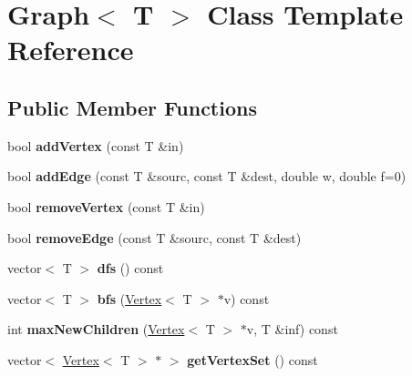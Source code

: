 \hypertarget{classGraph}{\section{Graph$<$ T $>$ Class Template Reference}
\label{classGraph}
}
\subsection*{Public Member Functions}
\begin{DoxyCompactItemize}
\item 
\hypertarget{classGraph_a00be284ea2be3b3d0f0d2e493b70245b}{bool {\bfseries add\-Vertex} (const T \&in)}\label{classGraph_a00be284ea2be3b3d0f0d2e493b70245b}

\item 
\hypertarget{classGraph_a78d952c4aa7ca2b828c1042b12995069}{bool {\bfseries add\-Edge} (const T \&sourc, const T \&dest, double w, double f=0)}\label{classGraph_a78d952c4aa7ca2b828c1042b12995069}

\item 
\hypertarget{classGraph_af9c903104ad69a7782979fa9caedf163}{bool {\bfseries remove\-Vertex} (const T \&in)}\label{classGraph_af9c903104ad69a7782979fa9caedf163}

\item 
\hypertarget{classGraph_a1106092a37366486cf55576f9ec01692}{bool {\bfseries remove\-Edge} (const T \&sourc, const T \&dest)}\label{classGraph_a1106092a37366486cf55576f9ec01692}

\item 
\hypertarget{classGraph_a6f66082eeeaef42d51cb7f2e2c3cb6e2}{vector$<$ T $>$ {\bfseries dfs} () const }\label{classGraph_a6f66082eeeaef42d51cb7f2e2c3cb6e2}

\item 
\hypertarget{classGraph_acd33e9b4f345aa28cf73f537ba176e6c}{vector$<$ T $>$ {\bfseries bfs} (\hyperlink{classVertex}{Vertex}$<$ T $>$ $\ast$v) const }\label{classGraph_acd33e9b4f345aa28cf73f537ba176e6c}

\item 
\hypertarget{classGraph_ab8fd74c3cf8dca6eaa82d39fd1216f52}{int {\bfseries max\-New\-Children} (\hyperlink{classVertex}{Vertex}$<$ T $>$ $\ast$v, T \&inf) const }\label{classGraph_ab8fd74c3cf8dca6eaa82d39fd1216f52}

\item 
\hypertarget{classGraph_ab7dc5ec1c34df811d560021b726e95ec}{vector$<$ \hyperlink{classVertex}{Vertex}$<$ T $>$ $\ast$ $>$ {\bfseries get\-Vertex\-Set} () const }\label{classGraph_ab7dc5ec1c34df811d560021b726e95ec}


\end{DoxyCompactItemize}

